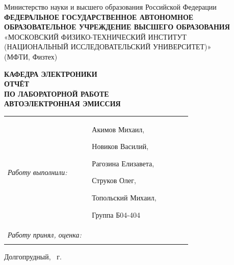\documentclass[12pt, a4paper]{article}
\begin{document}

\begin{titlepage}
\thispagestyle{empty}

\begin{center}
\small
Министерство науки и высшего образования Российской Федерации\\[2mm]
\textbf{ФЕДЕРАЛЬНОЕ ГОСУДАРСТВЕННОЕ АВТОНОМНОЕ
ОБРАЗОВАТЕЛЬНОЕ УЧРЕЖДЕНИЕ ВЫСШЕГО ОБРАЗОВАНИЯ}\\[1mm]
«МОСКОВСКИЙ ФИЗИКО-ТЕХНИЧЕСКИЙ ИНСТИТУТ\\
(НАЦИОНАЛЬНЫЙ ИССЛЕДОВАТЕЛЬСКИЙ УНИВЕРСИТЕТ)»\\
(МФТИ, Физтех)
\end{center}

\vspace{18mm}

\begin{center}
\large \textbf{КАФЕДРА ЭЛЕКТРОНИКИ}\\[10mm]
\Large \textbf{ОТЧЁТ}\\[2mm]
\large \textbf{ПО ЛАБОРАТОРНОЙ РАБОТЕ}\\[14mm]
\Large \textbf{АВТОЭЛЕКТРОННАЯ ЭМИССИЯ}
\end{center}

\vfill

\noindent
\begin{tabular}{@{}p{0.44\linewidth}p{0.52\linewidth}@{}}
\textit{Работу выполнили:} & Акимов Михаил,

Новиков Василий,

Рагозина Елизавета,

Струков Олег,

Топольский Михаил,

Группа Б04-404 \\[8mm]

\textit{Работу принял, оценка:} & \\[3mm]
 \\
\end{tabular}


\vspace{12mm}

\begin{center}
\small Долгопрудный, \the\year{}~г.
\end{center}

\end{titlepage}
\end{document}
